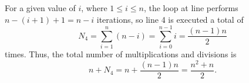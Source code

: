 \documentclass{homework}
\begin{document}
\begin{alphaparts}
		For a given value of $i$, where $1 \le i \le n$, the loop at line performs $n - (i+1) + 1 = n-i$ iterations, so line 4 is executed a total of
		\begin{equation}
			N_4 = \sum_{i=1}^n (n-i) = \sum_{i=0}^{n-1}i =\frac{(n-1)n}{2}
		\end{equation}
		times. Thus, the total number of multiplications and divisions is
		\begin{equation}
			n + N_4 = n + \frac{(n-1)n}{2} = \frac{n^2 + n}{2}.
		\end{equation}
	\end{alphaparts}
\end{document}
